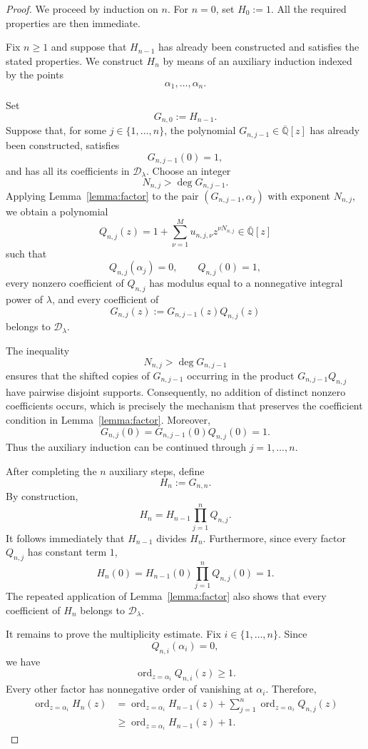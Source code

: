 \documentclass[10pt]{amsart}
\theoremstyle{definition}
\theoremstyle{remark}
\numberwithin{equation}{section}
\newcommand{\Qbar}{\overline{\mathbb Q}}
\newcommand{\D}{\mathcal D}
\newcommand{\ord}{\operatorname{ord}}
\begin{document}
\begin{proof}
We proceed by induction on $n$. For $n=0$, set $H_0:=1$. All the required
properties are then immediate.

Fix $n\geq1$ and suppose that $H_{n-1}$ has already been constructed and
satisfies the stated properties. We construct $H_n$ by means of an
auxiliary induction indexed by the points
\[
        \alpha_1,\ldots,\alpha_n.
\]

Set
\[
        G_{n,0}:=H_{n-1}.
\]
Suppose that, for some $j\in\{1,\ldots,n\}$, the polynomial
$G_{n,j-1}\in\Qbar[z]$ has already been constructed, satisfies
\[
        G_{n,j-1}(0)=1,
\]
and has all its coefficients in $\D_\lambda$. Choose an integer
\[
        N_{n,j}>\deg G_{n,j-1}.
\]
Applying Lemma~\ref{lemma:factor} to the pair
$(G_{n,j-1},\alpha_j)$ with exponent $N_{n,j}$, we obtain a polynomial
\[
        Q_{n,j}(z)
        =
        1+\sum_{\nu=1}^{M}
        u_{n,j,\nu}z^{\nu N_{n,j}}
        \in\Qbar[z]
\]
such that
\[
        Q_{n,j}(\alpha_j)=0,
        \qquad
        Q_{n,j}(0)=1,
\]
every nonzero coefficient of $Q_{n,j}$ has modulus equal to a
nonnegative integral power of $\lambda$, and every coefficient of
\[
        G_{n,j}(z)
        :=
        G_{n,j-1}(z)Q_{n,j}(z)
\]
belongs to $\D_\lambda$.

The inequality
\[
        N_{n,j}>\deg G_{n,j-1}
\]
ensures that the shifted copies of $G_{n,j-1}$ occurring in the product
$G_{n,j-1}Q_{n,j}$ have pairwise disjoint supports. Consequently, no
addition of distinct nonzero coefficients occurs, which is precisely the
mechanism that preserves the coefficient condition in
Lemma~\ref{lemma:factor}. Moreover,
\[
        G_{n,j}(0)
        =
        G_{n,j-1}(0)Q_{n,j}(0)
        =
        1.
\]
Thus the auxiliary induction can be continued through
$j=1,\ldots,n$.

After completing the $n$ auxiliary steps, define
\[
        H_n:=G_{n,n}.
\]
By construction,
\[
        H_n
        =
        H_{n-1}\prod_{j=1}^{n}Q_{n,j}.
\]
It follows immediately that $H_{n-1}$ divides $H_n$. Furthermore, since
every factor $Q_{n,j}$ has constant term $1$,
\[
        H_n(0)
        =
        H_{n-1}(0)\prod_{j=1}^{n}Q_{n,j}(0)
        =
        1.
\]
The repeated application of Lemma~\ref{lemma:factor} also shows that every
coefficient of $H_n$ belongs to $\D_\lambda$.

It remains to prove the multiplicity estimate. Fix
$i\in\{1,\ldots,n\}$. Since
\[
        Q_{n,i}(\alpha_i)=0,
\]
we have
\[
        \ord_{z=\alpha_i}Q_{n,i}(z)\geq1.
\]
Every other factor has nonnegative order of vanishing at $\alpha_i$.
Therefore,
\begin{align*}
        \ord_{z=\alpha_i}H_n(z)
        &=
        \ord_{z=\alpha_i}H_{n-1}(z)
        +
        \sum_{j=1}^{n}
        \ord_{z=\alpha_i}Q_{n,j}(z)\\
        &\geq
        \ord_{z=\alpha_i}H_{n-1}(z)+1.
\end{align*}


\end{proof}
\end{document}
